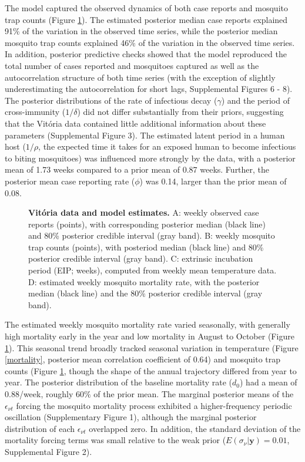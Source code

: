 \documentclass[10pt,letterpaper]{article}
\begin{document}
The model captured the observed dynamics of both case reports and mosquito trap counts (Figure \ref{timeseries}).
The estimated posterior median case reports explained 91\% of the variation in the observed time series, while the posterior median mosquito trap counts explained 46\% of the variation in the observed time series. 
In addition, posterior predictive checks showed that the model reproduced the total number of cases reported and mosquitoes captured as well as the autocorrelation structure of both time series (with the exception of slightly underestimating the autocorrelation for short lags, Supplemental Figures 6 - 8).
The posterior distributions of the rate of infectious decay ($\gamma$) and the period of cross-immunity ($1/\delta$) did not differ substantially from their priors, suggesting that the Vit\'oria data contained little additional information about these parameters (Supplemental Figure 3).
The estimated latent period in a human host ($1/\rho$, the expected time it takes for an exposed human to become infectious to biting mosquitoes) was influenced more strongly by the data, with a posterior mean of 1.73 weeks compared to a prior mean of 0.87 weeks.
Further, the posterior mean case reporting rate ($\phi$) was 0.14, larger than the prior mean of 0.08.

\begin{figure}[!h]
\caption{{\bf Vit\'oria data and model estimates.}
A: weekly observed case reports (points), with corresponding posterior median (black line) and 80\% posterior credible interval (gray band). B: weekly mosquito trap counts (points), with posteriod median (black line) and 80\% posterior credible interval (gray band). C: extrinsic incubation period (EIP; weeks), computed from weekly mean temperature data. D: estimated weekly mosquito mortality rate, with the posterior median (black line) and the 80\% posterior credible interval (gray band).
}
\label{timeseries}
\end{figure}

The estimated weekly mosquito mortality rate varied seasonally, with generally high mortality early in the year and low mortality in August to October (Figure \ref{timeseries}).
This seasonal trend broadly tracked seasonal variation in temperature (Figure \ref{mortality}, posterior mean correlation coefficient of 0.64) and mosquito trap counts (Figure \ref{timeseries}, though the shape of the annual trajectory differed from year to year.
The posterior distribution of the baseline mortality rate ($d_0$) had a mean of 0.88/week, roughly $60\%$ of the prior mean.
The marginal posterior means of the $\epsilon_{\nu t}$ forcing the mosquito mortality process exhibited a higher-frequency periodic oscillation (Supplementary Figure 1), although the marginal posterior distribution of each $\epsilon_{\nu t}$ overlapped zero.
In addition, the standard deviation of the mortality forcing terms was small relative to the weak prior ($E(\sigma_{\nu}|\mathbf{y}) = 0.01$, Supplemental Figure 2).
\end{document}
